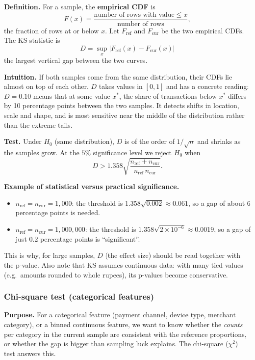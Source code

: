 \documentclass[11pt]{article}
\begin{document}
\textbf{Definition.} For a sample, the \textbf{empirical CDF} is
\[
F(x)=\frac{\text{number of rows with value}\le x}{\text{number of rows}},
\]
the fraction of rows at or below \(x\). Let \(F_{\text{ref}}\) and \(F_{\text{cur}}\) be the two empirical CDFs. The KS statistic is
\[
\boxed{
D=\sup_x\big|F_{\text{ref}}(x)-F_{\text{cur}}(x)\big|
}
\]
the largest vertical gap between the two curves.

\textbf{Intuition.} If both samples come from the same distribution, their CDFs lie almost on top of each other. \(D\) takes values in \([0,1]\) and has a concrete reading: \(D=0.10\) means that at some value \(x^\ast\), the share of transactions below \(x^\ast\) differs by 10 percentage points between the two samples. It detects shifts in location, scale and shape, and is most sensitive near the middle of the distribution rather than the extreme tails.

\textbf{Test.} Under \(H_0\) (same distribution), \(D\) is of the order of \(1/\sqrt{n}\) and shrinks as the samples grow. At the \(5\%\) significance level we reject \(H_0\) when
\[
D>1.358\sqrt{\frac{n_{\text{ref}}+n_{\text{cur}}}{n_{\text{ref}}\,n_{\text{cur}}}}.
\]

\textbf{Example of statistical versus practical significance.}
\begin{itemize}
    \item \(n_{\text{ref}}=n_{\text{cur}}=1{,}000\): the threshold is \(1.358\sqrt{0.002}\approx0.061\), so a gap of about 6 percentage points is needed.
    \item \(n_{\text{ref}}=n_{\text{cur}}=1{,}000{,}000\): the threshold is \(1.358\sqrt{2\times10^{-6}}\approx0.0019\), so a gap of just \(0.2\) percentage points is ``significant''.
\end{itemize}
This is why, for large samples, \(D\) (the effect size) should be read together with the p-value. Also note that KS assumes continuous data: with many tied values (e.g.\ amounts rounded to whole rupees), its p-values become conservative.

\subsubsection{Chi-square test (categorical features)}

\textbf{Purpose.} For a categorical feature (payment channel, device type, merchant category), or a binned continuous feature, we want to know whether the \emph{counts} per category in the current sample are consistent with the reference proportions, or whether the gap is bigger than sampling luck explains. The chi-square (\(\chi^2\)) test answers this.
\end{document}
